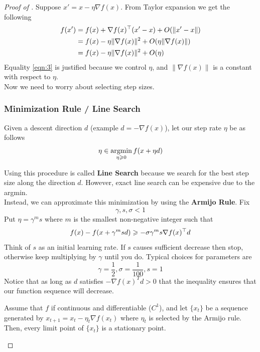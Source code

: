 \begin{proof}[Proof of ]
Suppose $x' = x - \eta \nabla f(x)$. From Taylor expansion we get the following
\begin{align}
    f(x') &= f(x) + \nabla f(x)^\top (x' - x) + O(\|x' - x\|) \nonumber\\
    &= f(x) - \eta\|\nabla f(x)\|^2 + O(\eta \|\nabla f(x)\|) \nonumber\\
    &= f(x) - \eta \|\nabla f(x)\|^2 + O(\eta) \label{eqn:3}
\end{align}
Equality \ref{eqn:3} is justified because we control $\eta$, and $\|\nabla f(x)\|$ is a constant with respect to $\eta$.\\
\newline
Now we need to worry about selecting step sizes.
\subsubsection{Minimization Rule / Line Search}
Given a descent direction $d$ (example $d = - \nabla f(x)$), let our step rate $\eta$ be as follows
\[
    \eta \in \mathop{\rm argmin}_{\eta \geqslant 0} f(x + \eta d)
\]

Using this procedure is called \textbf{Line Search} because we search for the best step size along the direction $d$. However, exact line search can be expensive due to the argmin.\\
\newline
Instead, we can approximate this minimization by using the \textbf{Armijo Rule}. 
Fix 
\[
    \gamma, s, \sigma < 1
\]
Put $\eta = \gamma^m s$ where $m$ is the smallest non-negative integer such that
\[
    f(x) - f(x + \gamma^m s d) \geqslant - \sigma \gamma^m s \nabla f(x)^\top d
\]
Think of $s$ as an initial learning rate. If $s$ causes sufficient decrease then stop, otherwise keep multiplying by $\gamma$ until you do. Typical choices for parameters are 
\[
    \gamma = \frac{1}{2}, \sigma = \frac{1}{100}, s = 1
\]
\newline
Notice that as long as $d$ satisfies $-\nabla f(x)^Td > 0$ that the inequality ensures that our function sequence will decrease.

\begin{proposition}
Assume that $f$ if continuous and differentiable ($C^1$), and let $\{x_t\}$ be a sequence generated by $x_{t+1} = x_t - \eta_t \nabla f(x_t)$ where $\eta_t$ is selected by the Armijo rule. Then, every limit point of $\{x_t\}$ is a stationary point.
\end{proposition}


\end{proof}
